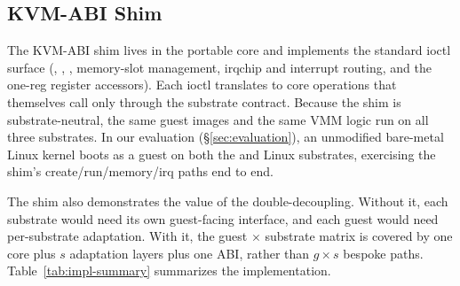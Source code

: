 \subsection{KVM-ABI Shim}
\label{sec:kvm-shim}

The KVM-ABI shim lives in the portable core and implements the standard ioctl
surface (, , ,
memory-slot management, irqchip and interrupt routing, and the one-reg register
accessors). Each ioctl translates to core operations that themselves call only
through the substrate contract. Because the shim is substrate-neutral, the same
guest images and the same VMM logic run on all three substrates. In our
evaluation (\S\ref{sec:evaluation}), an unmodified bare-metal Linux kernel boots
as a guest on both the \asterinas{} and Linux substrates, exercising the shim's
create/run/memory/irq paths end to end.

The shim also demonstrates the value of the double-decoupling. Without it, each
substrate would need its own guest-facing interface, and each guest would need
per-substrate adaptation. With it, the guest $\times$ substrate matrix is
covered by one core plus $s$ adaptation layers plus one ABI, rather than
$g \times s$ bespoke paths. Table~\ref{tab:impl-summary} summarizes the
implementation.
